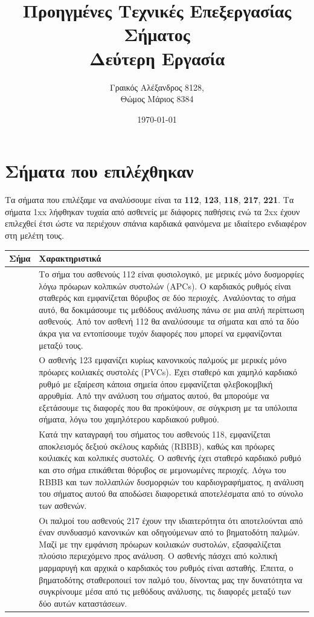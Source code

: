 \documentclass[11pt,a4paper]{article}
\title{Προηγμένες Τεχνικές Επεξεργασίας Σήματος\\Δεύτερη Εργασία}
\author{Γραικός Αλέξανδρος 8128, \\Θώμος Μάριος 8384}
\date{\today}
\begin{document}
\maketitle

\section*{Σήματα που επιλέχθηκαν}
Τα σήματα που επιλέξαμε να αναλύσουμε είναι τα \textbf{112}, \textbf{123}, \textbf{118}, \textbf{217}, \textbf{221}. Τα σήματα 1xx λήφθηκαν τυχαία από ασθενείς με διάφορες παθήσεις ενώ τα 2xx έχουν επιλεχθεί έτσι ώστε να περιέχουν σπάνια καρδιακά φαινόμενα με ιδιαίτερο ενδιαφέρον στη μελέτη τους.

\begin{center}
\begin{tabular}{| >{\centering\arraybackslash}m{1cm} | >{\centering\arraybackslash}m{15cm}|} 
 \hline
 Σήμα & Χαρακτηριστικά \\ 
 \hline 
 112 &  Το σήμα του ασθενούς 112 είναι φυσιολογικό, με μερικές μόνο δυσμορφίες λόγω πρόωρων κολπικών συστολών (APCs). Ο καρδιακός ρυθμός είναι σταθερός και εμφανίζεται θόρυβος σε δύο περιοχές. Αναλύοντας το σήμα αυτό, θα δοκιμάσουμε τις μεθόδους ανάλυσης πάνω σε μια απλή περίπτωση ασθενούς. Από τον ασθενή 112 θα αναλύσουμε τα σήματα και από τα δύο άκρα για να εντοπίσουμε τυχόν διαφορές που μπορεί να εμφανίζονται μεταξύ τους. \\
 \hline
 123 & Ο ασθενής 123 εμφανίζει κυρίως κανονικούς παλμούς με μερικές μόνο πρόωρες κοιλιακές συστολές (PVCs). Έχει σταθερό και χαμηλό καρδιακό ρυθμό με εξαίρεση κάποια σημεία όπου εμφανίζεται φλεβοκομβική αρρυθμία. Από την ανάλυση του σήματος αυτού, θα μπορούμε να εξετάσουμε τις διαφορές που θα προκύψουν, σε σύγκριση με τα υπόλοιπα σήματα, λόγω του χαμηλότερου καρδιακού ρυθμού. \\
 \hline
 118 & Κατά την καταγραφή του σήματος του ασθενούς 118, εμφανίζεται αποκλεισμός δεξιού σκέλους καρδιάς (RBBB), καθώς και πρόωρες κοιλιακές και κολπικές συστολές. Ο ασθενής έχει σταθερό καρδιακό ρυθμό και στο σήμα επικάθεται θόρυβος σε μεμονωμένες περιοχές. Λόγω του RBBB και των πολλαπλών δυσμορφιών του καρδιογραφήματος, η ανάλυση του σήματος αυτού θα αποδώσει διαφορετικά αποτελέσματα από το σύνολο των ασθενών. \\
 \hline
 217 & Οι παλμοί του ασθενούς 217 έχουν την ιδιαιτερότητα ότι αποτελούνται από έναν συνδυασμό κανονικών και οδηγούμενων από το βηματοδότη παλμών. Μαζί με την εμφάνιση πρόωρων κοιλιακών συστολών, εξασφαλίζεται πλούσιο περιεχόμενο προς ανάλυση. Ο ασθενής πάσχει από κολπική μαρμαρυγή και αρχικά ο καρδιακός του ρυθμός είναι ασταθής. Έπειτα, ο βηματοδότης σταθεροποιεί τον παλμό του, δίνοντας μας την δυνατότητα να συγκρίνουμε μέσα από τις μεθόδους ανάλυσης, τις διαφορές μεταξύ των δύο αυτών καταστάσεων. \\

\end{tabular}
\end{center}
\end{document}
